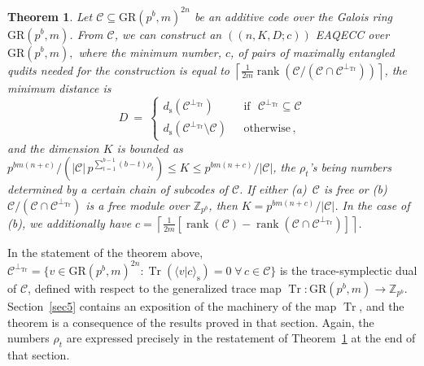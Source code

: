 \documentclass{article}
\DeclareMathOperator{\Tr}{Tr}
\DeclareMathOperator{\rank}{rank}
\newtheorem{thm}{Theorem}[section]
\theoremstyle{remark}
\theoremstyle{definition}
\numberwithin{equation}{section}
\begin{document}
\begin{thm}\label{dt3} Let $\mathcal{C} \subseteq \text{GR}(p^b,m)^{2n}$ be an additive code over the Galois ring $\text{GR}(p^b,m)$.   From $\mathcal{C}$, we can construct an  $((n,K,D;c))$ EAQECC over $\text{GR}(p^b,m),$ where the minimum number, $c$, of pairs of maximally entangled qudits needed for the construction is equal to  $\left\lceil \frac1{2m}\rank(\mathcal{C}/(\mathcal{C} \cap \mathcal{C}^{\perp_{\Tr}}))  \right\rceil$, the minimum distance is 
\begin{equation*}
D~=~\left\{\begin{array}{ll}
d_{\mathrm{s}}(\mathcal{C}^{\perp_{\Tr}}) & \text{~~if~~} \mathcal{C}^{\perp_{\Tr}} \subseteq \mathcal{C} \\
d_{\mathrm{s}}(\mathcal{C}^{\perp_{\Tr}}\setminus \mathcal{C} )  & \text{~~otherwise}\, , 
\end{array}\right.
\end{equation*}
and the dimension $K$ is bounded as $p^{bm(n+c)}/ (|\mathcal{C}| \, {p^{\sum_{t=1}^{b-1} (b-t)\rho_t}}) \leq  K \leq p^{bm(n+c)}/|\mathcal{C}|$, the $\rho_t$'s being numbers determined by a certain chain of subcodes of $\mathcal{C}$. If either \emph{(a)}~$\mathcal{C}$ is free or \emph{(b)}~$\mathcal{C}/(\mathcal{C} \cap \mathcal{C}^{\perp_{\Tr}})$ is a free module over $\mathbb{Z}_{p^b}$, then $K = p^{bm(n+c)}/|\mathcal{C}|$. In the case of \emph{(b)}, we additionally have $c=\left\lceil \frac1{2m}[\rank(\mathcal{C}) - \rank(\mathcal{C} \cap \mathcal{C}^{\perp_{\Tr}})]\right\rceil$.
\end{thm}

In the statement of the theorem above, $\mathcal{C}^{\perp_{\Tr}}=\{v \in \text{GR}(p^b,m)^{2n} :{\Tr}( \langle v | c\rangle_{\mathrm{s}}) = 0 \; \forall \, c \in \mathcal{C}\}$ is the trace-symplectic dual of $\mathcal{C}$, defined with respect to the generalized trace map ${\Tr}: \text{GR}(p^b,m) \to \mathbb{Z}_{p^b}$. Section~\ref{sec5} contains an exposition of the machinery of the map $\Tr$, and the theorem is a consequence of the results proved in that section. Again, the numbers $\rho_t$ are expressed precisely in the restatement of Theorem~\ref{dt3} at the end of that section.
\end{document}
